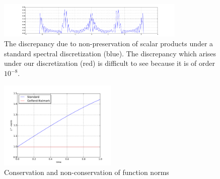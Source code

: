 \documentclass[final,leqno]{siamltex1213}
\begin{document}
\begin{figure}[h]
	\centering
	\includegraphics[width=0.8\textwidth]{./images/function_plots/discrepancy}
	\caption{The discrepancy due to non-preservation of scalar products under a standard spectral discretization (blue).
	The discrepancy which arises under our discretization (red) is difficult to see because it is of order $10^{-8}$. }
	\label{fig:discrepancy}
\end{figure}  
\begin{figure}[h]
	\centering
	\includegraphics[width=0.5\textwidth]{./images/L_inf_plot.pdf}
	\caption{Conservation and non-conservation of function norms}
	\label{fig:norms}
\end{figure}
\end{document}

